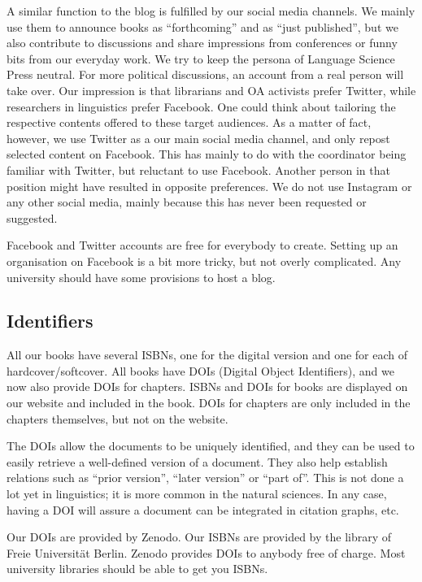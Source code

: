 \documentclass[nonflat,modfonts,output=book] {langsci/langscibook}
\begin{document}
A similar function to the blog is fulfilled by our social media channels. We mainly use them to announce books as ``forthcoming'' and as ``just published'', but we also contribute to discussions and share impressions from conferences or funny bits from our everyday work. We try to keep the persona of Language Science Press neutral. For more political discussions, an account from a real person will take over. Our impression is that librarians and OA activists prefer Twitter, while researchers in linguistics prefer Facebook. One could think about tailoring the respective contents offered to these target audiences. As a matter of fact, however, we use Twitter as a our main social media channel, and only repost selected content on Facebook. This has mainly to do with the coordinator being familiar with Twitter, but reluctant to use Facebook. Another person in that position might have resulted in opposite preferences. We do not use Instagram or any other social media, mainly because this has never been requested or suggested.

Facebook and Twitter accounts are free for everybody to create. Setting up an organisation on Facebook is a bit more tricky, but not overly complicated. Any university should have some provisions to host a blog.


\subsection{Identifiers}
All our books have several ISBNs, one for the digital version and one for each of hardcover/softcover. All books have DOIs (Digital Object Identifiers), and we now also provide DOIs for chapters. ISBNs and DOIs for books are displayed on our website and included in the book. DOIs for chapters are only included in the chapters themselves, but not on the website. 

The DOIs allow the documents to be uniquely identified, and they can be used to easily retrieve a well-defined version of a document. They also help establish relations such as ``prior version'', ``later version'' or ``part of''. This is not done a lot yet in linguistics; it is more common in the natural sciences. In any case, having a DOI will assure a document can be integrated in citation graphs, etc. 

Our DOIs are provided by Zenodo. Our ISBNs are provided by the library of Freie Universität Berlin. Zenodo provides DOIs to anybody free of charge. Most university libraries should be able to get you ISBNs. 
\end{document}
